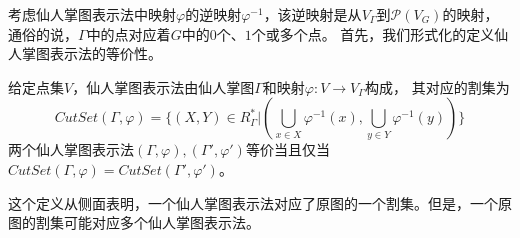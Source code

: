 考虑仙人掌图表示法中映射$\varphi$的逆映射$\varphi^{-1}$，该逆映射是从$V_\Gamma$到$\mathcal{P}(V_G)$的映射，
通俗的说，$\Gamma$中的点对应着$G$中的$0$个、$1$个或多个点。
首先，我们形式化的定义仙人掌图表示法的等价性。

\begin{definition}
  \label{cactusequal}
  给定点集$V$，仙人掌图表示法由仙人掌图$\Gamma$和映射$\varphi:V\rightarrow V_\Gamma$构成，
  其对应的割集为
  \begin{equation*}
    CutSet(\Gamma,\varphi)=\{(X,Y)\in R^*_{\Gamma}|(\bigcup_{x\in X}\varphi^{-1}(x),\bigcup_{y\in Y}\varphi^{-1}(y))\}
  \end{equation*}
  两个仙人掌图表示法$(\Gamma,\varphi),(\Gamma',\varphi')$等价当且仅当$CutSet(\Gamma,\varphi)=CutSet(\Gamma',\varphi')$。
\end{definition}

这个定义从侧面表明，一个仙人掌图表示法对应了原图的一个割集。但是，一个原图的割集可能对应多个仙人掌图表示法。

